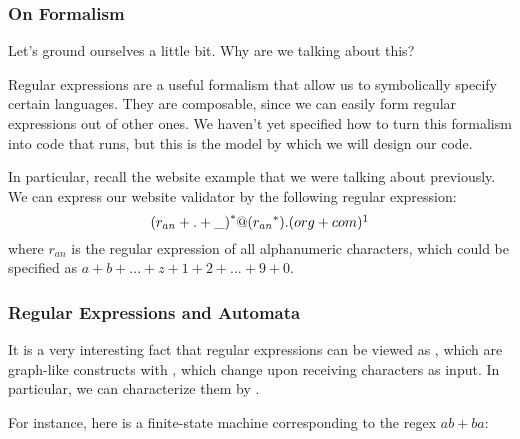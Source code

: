 \documentclass[aspectratio=169]{beamer}
\begin{document}
\begin{frame}[fragile]
  \frametitle{On Formalism}

  Let's ground ourselves a little bit. Why are we talking about this?

  \pause
  \vspace{\fill}

  Regular expressions are a useful formalism that allow us to symbolically
  specify certain languages. They are composable, since we can easily form
  regular expressions out of other ones. We haven't yet
  specified how to turn this formalism into code that runs, but this is
  the model by which we will design our code.

  \pause
  \vspace{\fill}

  In particular, recall the website example that we were talking about
  previously. We can express our website validator by the following
  regular expression:
  $${(r_{an} + . + \_ )}^* @ ({r_{an}}^*) . (org + com)\footnotemark$$
  where $r_{an}$ is the regular expression of all alphanumeric
  characters, which could be specified as $a + b + ... + z + 1 + 2 + ... + 9 + 0$.

\end{frame}


\begin{frame}[fragile]
  \frametitle{Regular Expressions and Automata}

  It is a very interesting fact that regular expressions can be viewed as
  , which are graph-like constructs with ,
  which change upon receiving characters as input. In particular, we can
  characterize them by .\footnotemark

  \pause
  \vspace{\fill}

  For instance, here is a finite-state machine corresponding to the regex $ab + ba$:

  \pause
  \vspace{\fill}


\end{frame}
\end{document}
